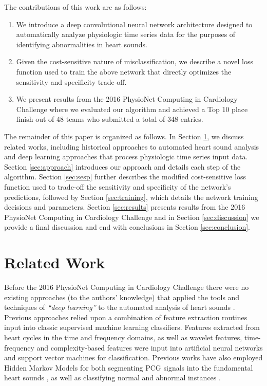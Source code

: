 \documentclass{article}
\begin{document}
The contributions of this work are as follows:

\begin{enumerate}
\item We introduce a deep convolutional neural network architecture designed to automatically analyze physiologic time series data for the purposes of identifying abnormalities in heart sounds.
\item Given the cost-sensitive nature of misclassification, we describe a novel loss function used to train the above network that directly optimizes the sensitivity and specificity trade-off.
\item We present results from the 2016 PhysioNet Computing in Cardiology Challenge where we evaluated our algorithm and achieved a Top 10 place finish out of 48 teams who submitted a total of 348 entries.
\end{enumerate}

The remainder of this paper is organized as follows. In Section \ref{sec:relatedwork}, we discuss related works, including historical approaches to automated heart sound analysis and deep learning approaches that process physiologic time series input data. Section \ref{sec:approach} introduces our approach and details each step of the algorithm. Section \ref{sec:sesp} further describes the modified cost-sensitive loss function used to trade-off the sensitivity and specificity of the network's predictions, followed by Section \ref{sec:training}, which details the network training decisions and parameters. Section \ref{sec:results} presents results from the 2016 PhysioNet Computing in Cardiology Challenge and in Section \ref{sec:discussion} we provide a final discussion and end with conclusions in Section \ref{sec:conclusion}.

\section{Related Work}
\label{sec:relatedwork}

Before the 2016 PhysioNet Computing in Cardiology Challenge there were no existing approaches (to the authors' knowledge) that applied the tools and techniques of \emph{``deep learning''} to the automated analysis of heart sounds \cite{liu2016open}. Previous approaches relied upon a combination of feature extraction routines input into classic supervised machine learning classifiers. Features extracted from heart cycles in the time and frequency domains, as well as wavelet features, time-frequency and complexity-based features were input into artificial neural networks \cite{de2007automated,uuguz2012adaptive,uuguz2012biomedical,sepehri2008computerized,bhatikar2005classifier} and support vector machines \cite{maglogiannis2009support,ari2010detection,zheng2015novel} for classification. Previous works have also employed Hidden Markov Models for both segmenting PCG signals into the fundamental heart sounds \cite{springer2014support,springer2016logistic}, as well as classifying normal and abnormal instances \cite{wang2007phonocardiographic,DBLP:journals/eaai/Saracoglu12}.
\end{document}
